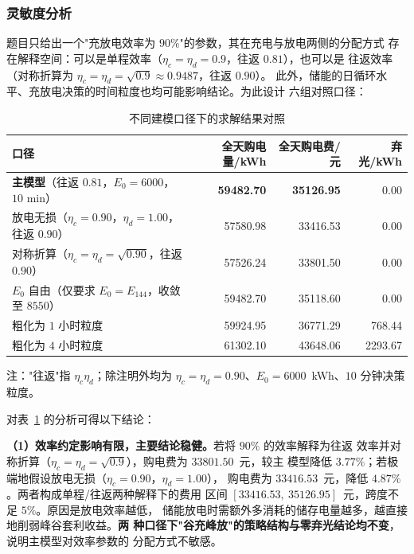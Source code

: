 \subsubsection{灵敏度分析}

题目只给出一个"充放电效率为 $90\%$"的参数，其在充电与放电两侧的分配方式
存在解释空间：可以是单程效率（$\eta_c=\eta_d=0.9$，往返 $0.81$），也可以是
往返效率（对称折算为 $\eta_c=\eta_d=\sqrt{0.9}\approx0.9487$，往返 $0.90$）。
此外，储能的日循环水平、充放电决策的时间粒度也均可能影响结论。为此设计
六组对照口径：

\begin{table}[htbp]
  \centering
  \caption{不同建模口径下的求解结果对照}
  \label{tab:p1-sensitivity}
  \footnotesize
  \begin{tabular}{lrrr}
    \toprule
    口径 & 全天购电量/kWh & 全天购电费/元 & 弃光/kWh \\
    \midrule
    \textbf{主模型}（往返 $0.81$，$E_0=6000$，$10$ min）
      & \textbf{59482.70} & \textbf{35126.95} & 0.00 \\
    放电无损（$\eta_c=0.90$，$\eta_d=1.00$，往返 $0.90$）
      & 57580.98 & 33416.53 & 0.00 \\
    对称折算（$\eta_c=\eta_d=\sqrt{0.90}$，往返 $0.90$）
      & 57526.24 & 33801.50 & 0.00 \\
    $E_0$ 自由（仅要求 $E_0=E_{144}$，收敛至 $8550$）
      & 59482.70 & 35118.60 & 0.00 \\
    粗化为 $1$ 小时粒度
      & 59924.95 & 36771.29 & 768.44 \\
    粗化为 $4$ 小时粒度
      & 61302.10 & 43648.06 & 2293.67 \\
    \bottomrule
  \end{tabular}
  \par\vspace{2pt}
  \begin{minipage}{.92\textwidth}
    \footnotesize 注："往返"指 $\eta_c\eta_d$；除注明外均为
    $\eta_c=\eta_d=0.90$、$E_0=6000$~kWh、$10$ 分钟决策粒度。
  \end{minipage}
\end{table}

对表~\ref{tab:p1-sensitivity} 的分析可得以下结论：

\textbf{（1）效率约定影响有限，主要结论稳健。}若将 $90\%$ 的效率解释为往返
效率并对称折算（$\eta_c=\eta_d=\sqrt{0.9}$），购电费为 $33801.50$~元，较主
模型降低 $3.77\%$；若极端地假设放电无损（$\eta_c=0.90$，$\eta_d=1.00$），
购电费为 $33416.53$~元，降低 $4.87\%$。两者构成单程/往返两种解释下的费用
区间 $[33416.53,\ 35126.95]$~元，跨度不足 $5\%$。原因是放电效率越低，
储能放电时需额外多消耗的储存电量越多，越直接地削弱峰谷套利收益。\textbf{两
种口径下"谷充峰放"的策略结构与零弃光结论均不变}，说明主模型对效率参数的
分配方式不敏感。

